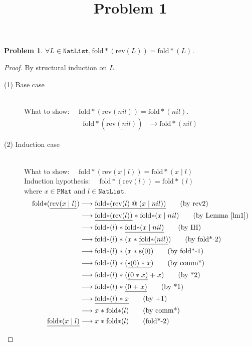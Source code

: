 \documentclass[12pt, a4paper]{article}
\title{Problem 1}
\date{\vspace{-5ex}}
\newtheorem{problem}{Problem}
\newcommand{\rel}[1]{\mathrel{#1}}
\newcommand{\rmx}[1]{\mathrm{#1}}
\newcommand{\larrow}{\longrightarrow}
\newcommand{\under}{\underline}
\begin{document}
\maketitle

\begin{problem}
$\forall L \in \mathtt{NatList}, \rmx{fold*}(\rmx{rev}(L)) = \rmx{fold*}(L)$.
\end{problem}
\begin{proof}
By structural induction on $L$.

\begin{description}

\item[(1) Base case]~\\
\noindent
What to show: $\quad\rmx{fold*}(\rmx{rev}(nil)) = \rmx{fold*}(nil)$.
\begin{align*}
\rmx{fold*}(\under{\rmx{rev}(nil)}) &\larrow \rmx{fold*}(nil) \tag{by rev1}
\end{align*}

\item[(2) Induction case]~\\
What to show: $\quad\rmx{fold*}(\rmx{rev}(x \rel{|} l)) = \rmx{fold*}(x \rel{|} l)$\\
Induction hypothesis: $\quad\rmx{fold*}(\rmx{rev}(l)) = \rmx{fold*}(l)$\\
where $x \in \mathtt{PNat}$ and $l \in \mathtt{NatList}$.
\begin{align*}
\rmx{fold*}(\under{\rmx{rev}(x \rel{|} l)}) 
	&\larrow \under{\rmx{fold*}(\rmx{rev}(l)\rel{@}(x \rel{|} nil))} \tag{by rev2} \\
	&\larrow \under{\rmx{fold*}(\rmx{rev}(l))} \rel{*} \rmx{fold*}(x \rel{|} nil) \tag{by Lemma~\ref{lm1}} \\
	&\larrow \rmx{fold*}(l) \rel{*} \under{\rmx{fold*}(x \rel{|} nil)} \tag{by IH} \\
	&\larrow \rmx{fold*}(l) \rel{*} (x \rel{*} \under{\rmx{fold*}(nil)}) \tag{by fold*-2} \\
	&\larrow \rmx{fold*}(l) \rel{*} (\under{x \rel{*} \rmx{s}(0)}) \tag{by fold*-1} \\
	&\larrow \rmx{fold*}(l) \rel{*} (\under{\rmx{s}(0) \rel{*} x}) \tag{by comm*} \\
	&\larrow \rmx{fold*}(l) \rel{*} (\under{(0 \rel{*} x)} \rel{+} x) \tag{by *2} \\
	&\larrow \rmx{fold*}(l) \rel{*} \under{(0 \rel{+} x)} \tag{by *1} \\
	&\larrow \under{\rmx{fold*}(l) \rel{*} x} \tag{by +1} \\
	&\larrow x \rel{*} \rmx{fold*}(l) \tag{by comm*} \\
\under{\rmx{fold*}(x \rel{|} l)} 
	&\larrow x \rel{*} \rmx{fold*}(l) \tag{fold*-2}
\end{align*}

\end{description}
\end{proof}
\end{document}
